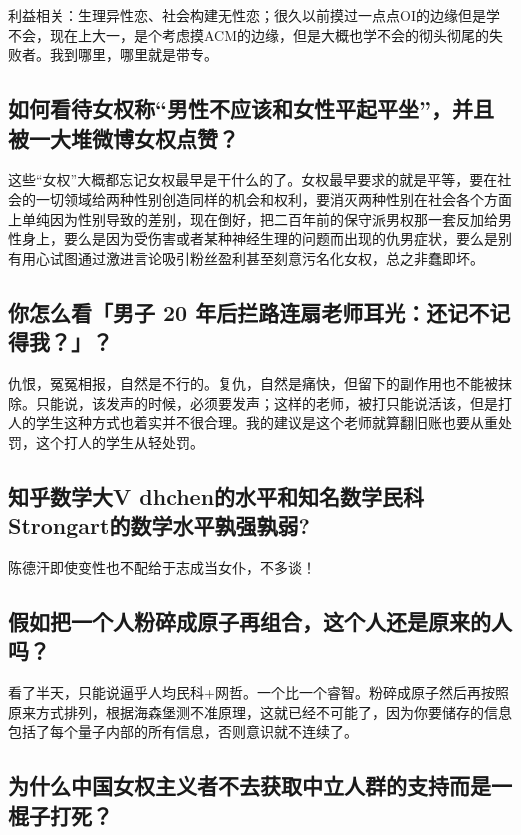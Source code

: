 \documentclass{ctexart}
\begin{document}
	利益相关：生理异性恋、社会构建无性恋；很久以前摸过一点点OI的边缘但是学不会，现在上大一，是个考虑摸ACM的边缘，但是大概也学不会的彻头彻尾的失败者。我到哪里，哪里就是带专。
	
	\subsection{如何看待女权称“男性不应该和女性平起平坐”，并且被一大堆微博女权点赞？}
	
	这些“女权”大概都忘记女权最早是干什么的了。女权最早要求的就是平等，要在社会的一切领域给两种性别创造同样的机会和权利，要消灭两种性别在社会各个方面上单纯因为性别导致的差别，现在倒好，把二百年前的保守派男权那一套反加给男性身上，要么是因为受伤害或者某种神经生理的问题而出现的仇男症状，要么是别有用心试图通过激进言论吸引粉丝盈利甚至刻意污名化女权，总之非蠢即坏。
	
	\subsection{你怎么看「男子 20 年后拦路连扇老师耳光：还记不记得我？」？}
	
	仇恨，冤冤相报，自然是不行的。复仇，自然是痛快，但留下的副作用也不能被抹除。只能说，该发声的时候，必须要发声；这样的老师，被打只能说活该，但是打人的学生这种方式也着实并不很合理。我的建议是这个老师就算翻旧账也要从重处罚，这个打人的学生从轻处罚。
	
	\subsection{知乎数学大V dhchen的水平和知名数学民科Strongart的数学水平孰强孰弱?}
	
	陈德汗即使变性也不配给于志成当女仆，不多谈！
	
	\subsection{假如把一个人粉碎成原子再组合，这个人还是原来的人吗？}
	
	看了半天，只能说逼乎人均民科+网哲。一个比一个睿智。粉碎成原子然后再按照原来方式排列，根据海森堡测不准原理，这就已经不可能了，因为你要储存的信息包括了每个量子内部的所有信息，否则意识就不连续了。
	
	\subsection{为什么中国女权主义者不去获取中立人群的支持而是一棍子打死？}
	
\end{document}
